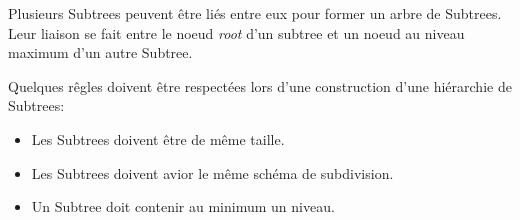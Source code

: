 Plusieurs Subtrees peuvent être liés entre eux pour former un arbre de Subtrees. Leur liaison se fait entre le noeud \textit{root} d'un subtree et un noeud au niveau maximum d'un autre Subtree.

Quelques rêgles doivent être respectées lors d'une construction d'une hiérarchie de Subtrees:

\begin{itemize}
    \item Les Subtrees doivent être de même taille.
    \item Les Subtrees doivent avior le même schéma de subdivision.
    \item Un Subtree doit contenir au minimum un niveau.
\end{itemize}